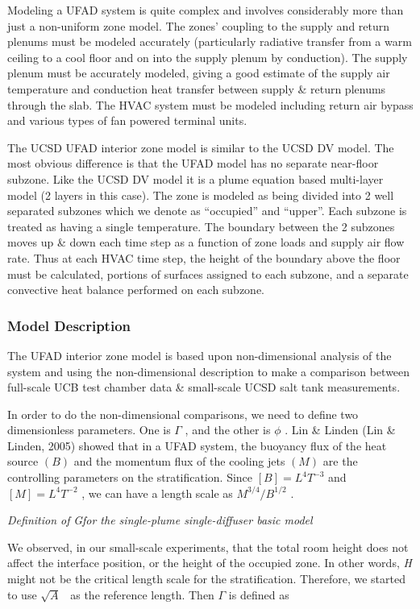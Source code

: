 Modeling a UFAD system is quite complex and involves considerably more than just a non-uniform zone model. The zones' coupling to the supply and return plenums must be modeled accurately (particularly radiative transfer from a warm ceiling to a cool floor and on into the supply plenum by conduction). The supply plenum must be accurately modeled, giving a good estimate of the supply air temperature and conduction heat transfer between supply \& return plenums through the slab. The HVAC system must be modeled including return air bypass and various types of fan powered terminal units.

The UCSD UFAD interior zone model is similar to the UCSD DV model. The most obvious difference is that the UFAD model has no separate near-floor subzone. Like the UCSD DV model it is a plume equation based multi-layer model (2 layers in this case). The zone is modeled as being divided into 2 well separated subzones which we denote as ``occupied'' and ``upper''. Each subzone is treated as having a single temperature. The boundary between the 2 subzones moves up \& down each time step as a function of zone loads and supply air flow rate. Thus at each HVAC time step, the height of the boundary above the floor must be calculated, portions of surfaces assigned to each subzone, and a separate convective heat balance performed on each subzone.

\subsubsection{Model Description}\label{model-description-1-001}

The UFAD interior zone model is based upon non-dimensional analysis of the system and using the non-dimensional description to make a comparison between full-scale UCB test chamber data \& small-scale UCSD salt tank measurements.

In order to do the non-dimensional comparisons, we need to define two dimensionless parameters. One is \(\Gamma\) , and the other is \(\phi\) . Lin \& Linden (Lin \& Linden, 2005) showed that in a UFAD system, the buoyancy flux of the heat source \((B)\) and the momentum flux of the cooling jets \((M)\) are the controlling parameters on the stratification. Since \([B] = {L^4}{T^{ - 3}}\) and\([M] = {L^4}{T^{ - 2}}\) , we can have a length scale as \({M^{3/4}}/{B^{1/2}}\) .

\emph{Definition of} \emph{Gfor the single-plume single-diffuser basic model}

We observed, in our small-scale experiments, that the total room height does not affect the interface position, or the height of the occupied zone. In other words, \emph{H} might not be the critical length scale for the stratification. Therefore, we started to use \(\sqrt A\) ~as the reference length. Then \(\Gamma\) is defined as

